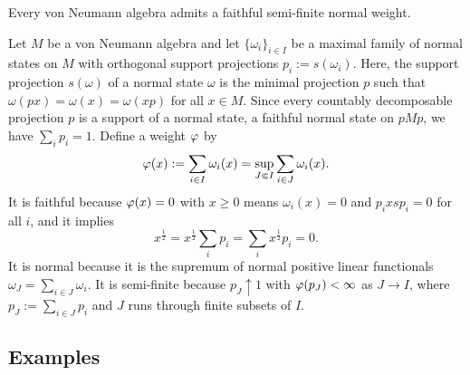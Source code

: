 \documentclass{../../../small}
\begin{document}
\begin{prop}
Every von Neumann algebra admits a faithful semi-finite normal weight.
\end{prop}
\begin{pf}
Let $M$ be a von Neumann algebra and let $\{\omega_i\}_{i\in I}$ be a maximal family of normal states on $M$ with orthogonal support projections $p_i:=s(\omega_i)$.
Here, the support projection $s(\omega)$ of a normal state $\omega$ is the minimal projection $p$ such that $\omega(px)=\omega(x)=\omega(xp)$ for all $x\in M$.
Since every countably decomposable projection $p$ is a support of a normal state, a faithful normal state on $pMp$, we have $\sum_ip_i=1$.
Define a weight $\varphi$ by
\[\varphi(x):=\sum_{i\in I}\omega_i(x)=\sup_{J\Subset I}\sum_{i\in J}\omega_i(x).\]
It is faithful because $\varphi(x)=0$ with $x\ge0$ means $\omega_i(x)=0$ and $p_ixsp_i=0$ for all $i$, and it implies
\[x^{\frac12}=x^{\frac12}\sum_ip_i=\sum_ix^{\frac12}p_i=0.\]
It is normal because it is the supremum of normal positive linear functionals $\omega_J=\sum_{i\in J}\omega_i$.
It is semi-finite because $p_J\uparrow1$ with $\varphi(p_J)<\infty$ as $J\to I$, where $p_J:=\sum_{i\in J}p_i$ and $J$ runs through finite subsets of $I$.
\end{pf}



\subsection{Examples}
\end{document}

